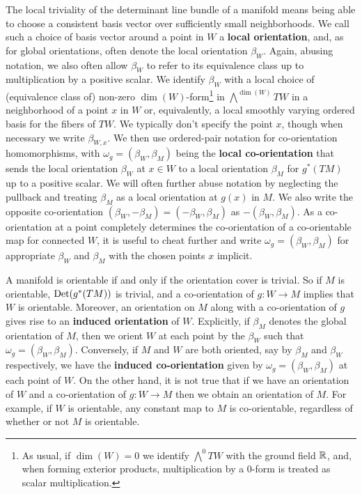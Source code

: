 The local triviality of the determinant
line bundle of a manifold means being able to choose a consistent basis vector
over sufficiently small neighborhoods.
We call such a choice of basis vector around a point
in $W$ a \textbf{local orientation}, and, as for global orientations, often denote the local orientation $\beta_W$.
Again, abusing notation, we also often allow $\beta_W$ to refer to its equivalence class up to multiplication by a positive scalar.
We identify $\beta_W$ with a local choice of (equivalence class of) non-zero $\dim(W)$-form\footnote{As usual, if $\dim(W)=0$ we identify $\bigwedge^0 TW$ with the ground field $\mathbb{R}$, and, when forming exterior products, multiplication by a $0$-form is treated as scalar multiplication.} in $\bigwedge^{\dim(W)}TW$ in a neighborhood of a point $x$ in $W$ or, equivalently, a local smoothly varying ordered basis for the fibers of $TW$.
We typically don't specify the point $x$, though when necessary we write $\beta_{W,x}$.
We then use ordered-pair notation for co-orientation homomorphisms,
with $\omega_g = (\beta_W, \beta_M)$ being the \textbf{local co-orientation} that sends
the local orientation $\beta_W$ at $x\in W$ to a local orientation $\beta_M$ for $g^*(TM)$ up to a positive scalar.
We will often further abuse notation by neglecting the pullback and treating $\beta_M$ as a local orientation at $g(x)$ in $M$.
We also write the opposite co-orientation $(\beta_W,-\beta_M)=(-\beta_W,\beta_M)$ as $-(\beta_W,\beta_M)$.
As a co-orientation at a point completely determines the co-orientation of a co-orientable map for connected $W$, it is useful to cheat further and write $\omega_g=(\beta_W,\beta_M)$ for appropriate $\beta_W$ and $\beta_M$ with the chosen points $x$ implicit.

A manifold is orientable if and only if the orientation cover is trivial.
So if $M$ is orientable, ${\rm Det}(g^*(TM))$ is trivial, and a co-orientation
of $g: W \to M$ implies that $W$ is orientable.
Moreover, an orientation on $M$ along with a co-orientation of $g$ gives rise to an \textbf{induced orientation} of $W$.
Explicitly, if $\beta_M$ denotes the global orientation of $M$, then we orient $W$ at each point by the $\beta_W$ such that $\omega_g=(\beta_W,\beta_M)$.
Conversely, if $M$ and $W$ are both oriented, say by $\beta_M$ and $\beta_W$ respectively, we have the \textbf{induced co-orientation} given by $\omega_g=(\beta_W,\beta_M)$ at each point of $W$.
On the other hand, it is not true that if we have an orientation of $W$ and a co-orientation of $g:W\to M$ then we obtain an orientation of $M$.
For example, if $W$ is orientable, any constant map to $M$ is co-orientable, regardless of whether or not $M$ is orientable.

